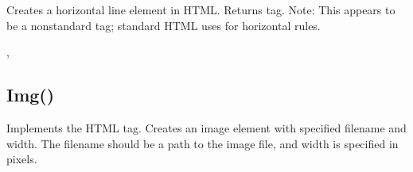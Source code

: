 \documentclass[letterpaper,10pt,english]{sphinxmanual}
\begin{document}
\sphinxAtStartPar
Creates a horizontal line element in HTML. Returns  tag. Note: This appears to be a non\sphinxhyphen{}standard tag; standard HTML uses  for horizontal rules.

\sphinxAtStartPar
{}

\begin{sphinxVerbatim}[commandchars=\\\{\}]
\end{sphinxVerbatim}

\sphinxAtStartPar
{}

\begin{sphinxVerbatim}[commandchars=\\\{\}]
\end{sphinxVerbatim}

\sphinxAtStartPar
{}

\sphinxAtStartPar
{}, 

\ignorespaces 

\subsection{Img()}
\label{\detokenize{reference/html:img}}\label{\detokenize{reference/html:index-6}}
\sphinxAtStartPar
{}

\sphinxAtStartPar
Implements the HTML  tag. Creates an image element with specified filename and width. The filename should be a path to the image file, and width is specified in pixels.

\sphinxAtStartPar
{}

\begin{sphinxVerbatim}[commandchars=\\\{\}]
\end{sphinxVerbatim}

\sphinxAtStartPar
{}
\end{document}
